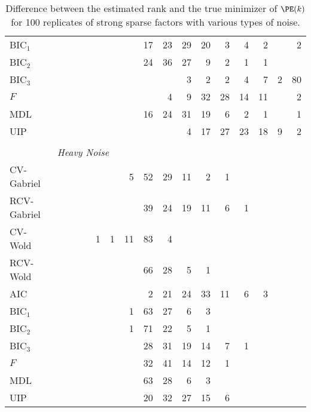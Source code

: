 \begin{table}
\begin{tabular}{lrrrrrrrrrrrrrrrr}
 BIC$_1$ &  &  &  &  &  &  &  &  17 &  23 &  29 &  20 &  3 &  4 &  2 &  &  2\\ 
 BIC$_2$ &  &  &  &  &  &  &  &  24 &  36 &  27 &  9 &  2 &  1 &  1 &  & \\ 
 BIC$_3$ &  &  &  &  &  &  &  &  &  &  3 &  2 &  2 &  4 &  7 &  2 &  80\\ 
 $F$ &  &  &  &  &  &  &  &  &  4 &  9 &  32 &  28 &  14 &  11 &  &  2\\ 
 MDL &  &  &  &  &  &  &  &  16 &  24 &  31 &  19 &  6 &  2 &  1 &  &  1\\ 
 UIP &  &  &  &  &  &  &  &  &  &  4 &  17 &  27 &  23 &  18 &  9 &  2\\ 
        \\
        &\multicolumn{16}{l}{\scriptsize{\textit{Heavy Noise}}} \\
CV-Gabriel &  &  &  &  &  &  &  5 &  52 &  29 &  11 &  2 &  1 &  &  &  & \\ 
 RCV-Gabriel &  &  &  &  &  &  &  &  39 &  24 &  19 &  11 &  6 &  1 &  &  & \\ 
 CV-Wold &  &  &  &  &  1 &  1 &  11 &  83 &  4 &  &  &  &  &  &  & \\ 
 RCV-Wold &  &  &  &  &  &  &  &  66 &  28 &  5 &  1 &  &  &  &  & \\ 
 AIC &  &  &  &  &  &  &  &  2 &  21 &  24 &  33 &  11 &  6 &  3 &  & \\ 
 BIC$_1$ &  &  &  &  &  &  &  1 &  63 &  27 &  6 &  3 &  &  &  &  & \\ 
 BIC$_2$ &  &  &  &  &  &  &  1 &  71 &  22 &  5 &  1 &  &  &  &  & \\ 
 BIC$_3$ &  &  &  &  &  &  &  &  28 &  31 &  19 &  14 &  7 &  1 &  &  & \\ 
 $F$ &  &  &  &  &  &  &  &  32 &  41 &  14 &  12 &  1 &  &  &  & \\ 
 MDL &  &  &  &  &  &  &  &  63 &  28 &  6 &  3 &  &  &  &  & \\ 
 UIP &  &  &  &  &  &  &  &  20 &  32 &  27 &  15 &  6 &  &  &  & \\ 
        \bottomrule
    \end{tabular}
    \caption{
        Difference between the estimated rank and the true minimizer of 
        $\PE(k)$ for 100 replicates of strong sparse factors with various
        types of noise.
    }\label{T:rank-est-strong-sparse}
\end{table}

